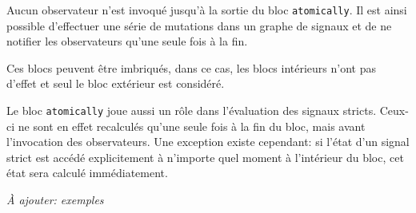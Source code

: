 Aucun observateur n'est invoqué jusqu'à la sortie du bloc \texttt{atomically}. Il est ainsi possible d'effectuer une série de mutations dans un graphe de signaux et de ne notifier les observateurs qu'une seule fois à la fin.

Ces blocs peuvent être imbriqués, dans ce cas, les blocs intérieurs n'ont pas d'effet et seul le bloc extérieur est considéré.

Le bloc \texttt{atomically} joue aussi un rôle dans l'évaluation des signaux stricts. Ceux-ci ne sont en effet recalculés qu'une seule fois à la fin du bloc, mais avant l'invocation des observateurs. Une exception existe cependant: si l'état d'un signal strict est accédé explicitement à n'importe quel moment à l'intérieur du bloc, cet état sera calculé immédiatement.

\textit{À ajouter: exemples}


